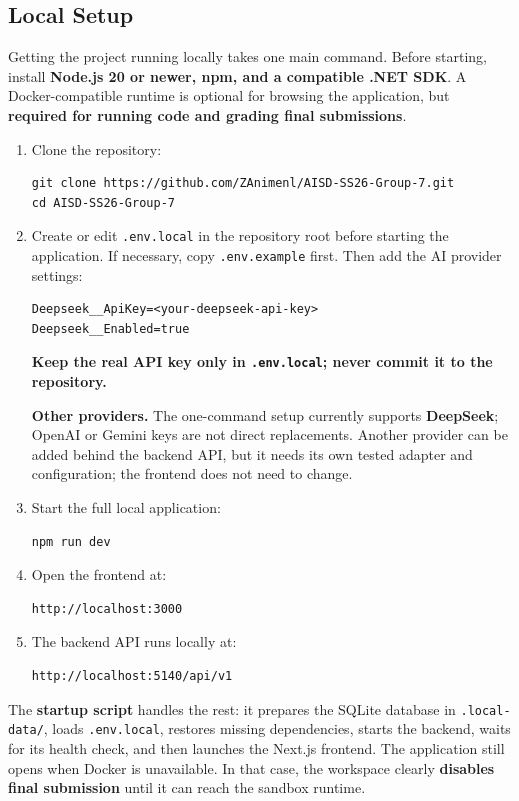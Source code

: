 \documentclass[11pt,a4paper]{article}
\begin{document}
\subsection{Local Setup}

Getting the project running locally takes one main command. Before starting, install \textbf{Node.js 20 or newer, npm, and a compatible .NET SDK}. A Docker-compatible runtime is optional for browsing the application, but \textbf{required for running code and grading final submissions}.

\begin{enumerate}
  \item Clone the repository:
  \begin{verbatim}
git clone https://github.com/ZAnimenl/AISD-SS26-Group-7.git
cd AISD-SS26-Group-7
  \end{verbatim}
  \item Create or edit \texttt{.env.local} in the repository root before starting the application. If necessary, copy \texttt{.env.example} first. Then add the AI provider settings:
  \begin{verbatim}
Deepseek__ApiKey=<your-deepseek-api-key>
Deepseek__Enabled=true
  \end{verbatim}
  \textbf{Keep the real API key only in \texttt{.env.local}; never commit it to the repository.}

  \textbf{Other providers.} The one-command setup currently supports \textbf{DeepSeek}; OpenAI or Gemini keys are not direct replacements. Another provider can be added behind the backend API, but it needs its own tested adapter and configuration; the frontend does not need to change.
  \item Start the full local application:
  \begin{verbatim}
npm run dev
  \end{verbatim}
  \item Open the frontend at:
  \begin{verbatim}
http://localhost:3000
  \end{verbatim}
  \item The backend API runs locally at:
  \begin{verbatim}
http://localhost:5140/api/v1
  \end{verbatim}
\end{enumerate}

The \textbf{startup script} handles the rest: it prepares the SQLite database in \texttt{.local-data/}, loads \texttt{.env.local}, restores missing dependencies, starts the backend, waits for its health check, and then launches the Next.js frontend. The application still opens when Docker is unavailable. In that case, the workspace clearly \textbf{disables final submission} until it can reach the sandbox runtime.
\end{document}

